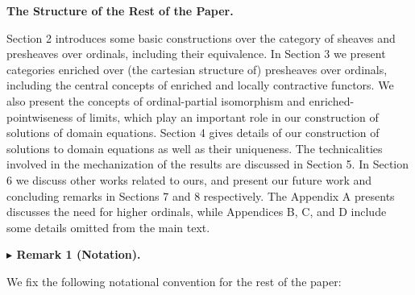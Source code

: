 \documentclass[10pt,a4paper]{article}
\begin{document}
 
 
 
\par\medskip\noindent\textbf{The Structure of the Rest of the Paper.}\par
 
 
Section 2 introduces some basic constructions over the category of sheaves and presheaves over ordinals, including their equivalence. In Section 3 we present categories enriched over (the cartesian structure of) presheaves over ordinals, including the central concepts of enriched and locally contractive functors. We also present the concepts of ordinal-partial isomorphism and enriched-pointwiseness of limits, which play an important role in our construction of solutions of domain equations. Section 4 gives details of our construction of solutions to domain equations as well as their uniqueness. The technicalities involved in the mechanization of the results are discussed in Section 5. In Section 6 we discuss other works related to ours, and present our future work and concluding remarks in Sections 7 and 8 respectively. The Appendix A presents discusses the need for higher ordinals, while Appendices B, C, and D include some details omitted from the main text.\par
 
 
 
\par\medskip\noindent\textbf{$\blacktriangleright$ Remark 1 (Notation).}\par
 
 
We fix the following notational convention for the rest of the paper:\par
 
\end{document}
